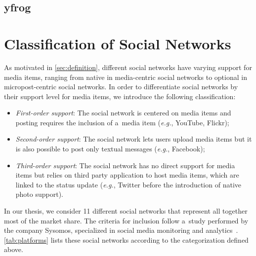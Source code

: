 \subsection{yfrog}

\section{Classification of Social Networks}
As motivated in \autoref{sec:definition}, different social networks have varying support
for media items, ranging from native in media-centric social networks
to optional in micropost-centric social networks.
In order to differentiate social networks by their support level for media items,
we introduce the following classification:

\begin{itemize}
  \item \emph{First-order support}: The social network is centered on media items and posting requires the inclusion of a~media item (\emph{e.g.}, YouTube, Flickr);
  \item \emph{Second-order support}: The social network lets users upload media items but it is also possible to post only textual messages (\emph{e.g.}, Facebook);
  \item \emph{Third-order support}: The social network has no direct support for media items but relies on third party application to host media items,
which are linked to the status update (\emph{e.g.}, Twitter before the introduction of native photo support).
\end{itemize}

In our thesis, we consider 11 different social networks that represent all together most of the market share.
The criteria for inclusion follow a~study performed by the company Sysomos, specialized in social media monitoring and analytics~\cite{Levine2011}.
\autoref{tab:platforms} lists these social networks according to the categorization defined above.

